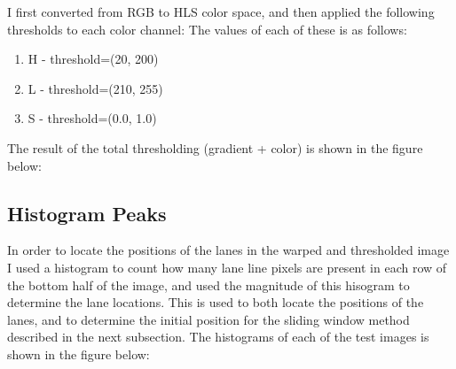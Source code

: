 \documentclass[letterpaper,12pt]{article}
\begin{document}
I first converted from RGB to HLS color space, and then applied the following thresholds to each color channel:
The values of each of these is as follows:
\begin{enumerate}
\item H - threshold=(20, 200)
\item L - threshold=(210, 255)
\item S - threshold=(0.0, 1.0)
\end{enumerate}
The result of the total thresholding (gradient + color) is shown in the figure below:
\FloatBarrier
\begin{figure}
\centering
{}
\end{figure}
\FloatBarrier
\subsection{Histogram Peaks}
In order to locate the positions of the lanes in the warped and thresholded image I used a histogram to count how many lane line pixels are present in each row of the bottom half of the image, and used the magnitude of this hisogram to determine the lane locations. This is used to both locate the positions of the lanes, and to determine the initial position for the sliding window method described in the next subsection. The histograms of each of the test images is shown in the figure below:
\FloatBarrier
\begin{figure}
\centering
{}
\end{figure}
\FloatBarrier
\end{document}

